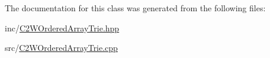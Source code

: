 The documentation for this class was generated from the following files\+:\begin{DoxyCompactItemize}
\item 
inc/\hyperlink{_c2_w_ordered_array_trie_8hpp}{C2\+W\+Ordered\+Array\+Trie.\+hpp}\item 
src/\hyperlink{_c2_w_ordered_array_trie_8cpp}{C2\+W\+Ordered\+Array\+Trie.\+cpp}\end{DoxyCompactItemize}
